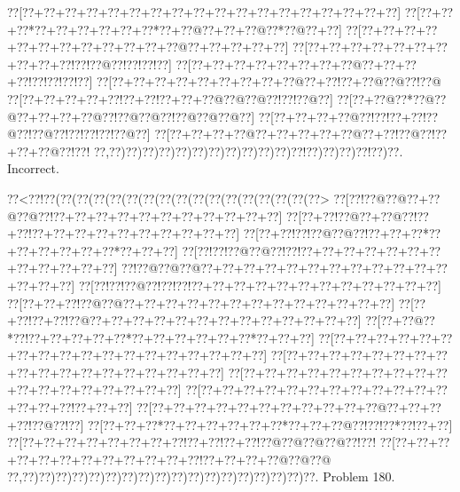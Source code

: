 \documentclass[a5paper]{article}
\begin{document}
\begin{center}
{\goo
\0??[\0??+\0??+\0??+\0??+\0??+\0??+\0??+\0??+\0??+\0??+\0??+\0??+\0??+\0??+\0??+\0??+\0??+\0??]
\0??[\0??+\0??+\0??*\0??+\0??+\0??+\0??+\0??+\0??*\0??+\0??@\0??+\0??+\0??@\0??*\0??@\0??+\0??]
\0??[\0??+\0??+\0??+\0??+\0??+\0??+\0??+\0??+\0??+\0??+\0??+\0??@\0??+\0??+\0??+\0??+\0??]
\0??[\0??+\0??+\0??+\0??+\0??+\0??+\0??+\0??+\0??+\0??!\0??!\0??@\0??!\0??!\0??!\0??]
\0??[\0??+\0??+\0??+\0??+\0??+\0??+\0??+\0??@\0??+\0??+\0??+\0??!\0??!\0??!\0??!\0??]
\0??[\0??+\0??+\0??+\0??+\0??+\0??+\0??+\0??+\0??@\0??+\0??!\0??+\0??@\0??@\0??!\0??@
\0??[\0??+\0??+\0??+\0??+\0??!\0??+\0??!\0??+\0??+\0??@\0??@\0??@\0??!\0??!\0??@\0??]
\0??[\0??+\0??@\0??*\0??@\0??@\0??+\0??+\0??+\0??@\0??!\0??@\0??@\0??!\0??@\0??@\0??@\0??]
\0??[\0??+\0??+\0??+\0??@\0??!\0??!\0??+\0??!\0??@\0??!\0??@\0??!\0??!\0??!\0??!\0??@\0??]
\0??[\0??+\0??+\0??+\0??@\0??+\0??+\0??+\0??+\0??@\0??+\0??!\0??@\0??!\0??+\0??+\0??@\0??!\0??!
\0??,\0??)\0??)\0??)\0??)\0??)\0??)\0??)\0??)\0??)\0??)\0??)\0??!\0??)\0??)\0??)\0??!\0??)\0??.
}
Incorrect. 

\end{center}
\newpage
\begin{center}
{\goo
\0??<\0??!\0??(\0??(\0??(\0??(\0??(\0??(\0??(\0??(\0??(\0??(\0??(\0??(\0??(\0??(\0??(\0??(\0??>
\0??[\0??!\0??@\0??@\0??+\0??@\0??@\0??!\0??+\0??+\0??+\0??+\0??+\0??+\0??+\0??+\0??+\0??+\0??]
\0??[\0??+\0??!\0??@\0??+\0??@\0??!\0??+\0??!\0??+\0??+\0??+\0??+\0??+\0??+\0??+\0??+\0??+\0??]
\0??[\0??+\0??!\0??!\0??@\0??@\0??!\0??+\0??+\0??*\0??+\0??+\0??+\0??+\0??+\0??*\0??+\0??+\0??]
\0??[\0??!\0??!\0??@\0??@\0??!\0??!\0??+\0??+\0??+\0??+\0??+\0??+\0??+\0??+\0??+\0??+\0??+\0??]
\0??!\0??@\0??@\0??@\0??+\0??+\0??+\0??+\0??+\0??+\0??+\0??+\0??+\0??+\0??+\0??+\0??+\0??+\0??]
\0??[\0??!\0??!\0??@\0??!\0??!\0??!\0??+\0??+\0??+\0??+\0??+\0??+\0??+\0??+\0??+\0??+\0??+\0??]
\0??[\0??+\0??+\0??!\0??@\0??@\0??+\0??+\0??+\0??+\0??+\0??+\0??+\0??+\0??+\0??+\0??+\0??+\0??]
\0??[\0??+\0??!\0??+\0??!\0??@\0??+\0??+\0??+\0??+\0??+\0??+\0??+\0??+\0??+\0??+\0??+\0??+\0??]
\0??[\0??+\0??@\0??*\0??!\0??+\0??+\0??+\0??+\0??*\0??+\0??+\0??+\0??+\0??+\0??*\0??+\0??+\0??]
\0??[\0??+\0??+\0??+\0??+\0??+\0??+\0??+\0??+\0??+\0??+\0??+\0??+\0??+\0??+\0??+\0??+\0??+\0??]
\0??[\0??+\0??+\0??+\0??+\0??+\0??+\0??+\0??+\0??+\0??+\0??+\0??+\0??+\0??+\0??+\0??+\0??+\0??]
\0??[\0??+\0??+\0??+\0??+\0??+\0??+\0??+\0??+\0??+\0??+\0??+\0??+\0??+\0??+\0??+\0??+\0??+\0??]
\0??[\0??+\0??+\0??+\0??+\0??+\0??+\0??+\0??+\0??+\0??+\0??+\0??+\0??+\0??+\0??!\0??+\0??+\0??]
\0??[\0??+\0??+\0??+\0??+\0??+\0??+\0??+\0??+\0??+\0??+\0??@\0??+\0??+\0??+\0??!\0??@\0??!\0??]
\0??[\0??+\0??+\0??*\0??+\0??+\0??+\0??+\0??+\0??*\0??+\0??+\0??@\0??!\0??!\0??*\0??!\0??+\0??]
\0??[\0??+\0??+\0??+\0??+\0??+\0??+\0??+\0??!\0??+\0??!\0??+\0??!\0??@\0??@\0??@\0??@\0??!\0??!
\0??[\0??+\0??+\0??+\0??+\0??+\0??+\0??+\0??+\0??+\0??+\0??+\0??!\0??+\0??+\0??+\0??@\0??@\0??@
\0??,\0??)\0??)\0??)\0??)\0??)\0??)\0??)\0??)\0??)\0??)\0??)\0??)\0??)\0??)\0??)\0??)\0??)\0??.
}
Problem 180.

\end{center}
\end{document}
